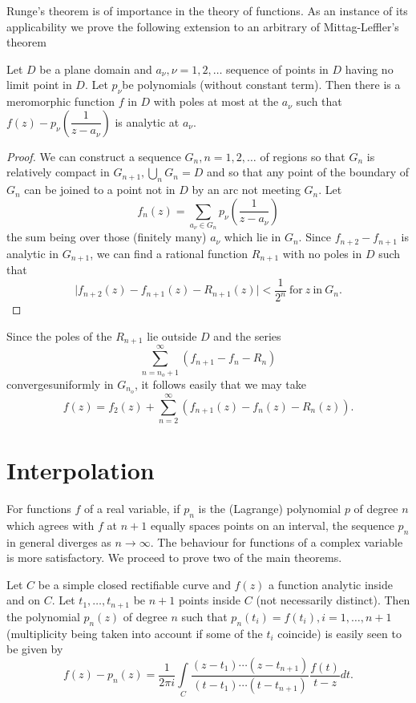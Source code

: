  Runge's theorem is of importance in the theory of functions.  As an
 instance of its applicability we prove the following extension to an
 arbitrary of Mittag-Leffler's theorem 

 \begin{Thm*}
   Let $D$ be a plane domain and $a_\nu ,  \nu = 1,2, \ldots$ sequence
   of points in $D$ having no limit point in $D$. Let $p_\nu$be
   polynomials (without constant term). Then there is a meromorphic
   function $f$ in $D$ with poles at most at the $a_\nu$ such that
   $f(z)-p_\nu \left(\dfrac{1}{z-a_\nu}\right)$ is analytic at $a_\nu$. 
 \end{Thm*} 

\begin{proof}
  We can construct a sequence $G_n, n=1,2, \ldots$ of regions so that
  $G_n$ is relatively compact in $G_{n+1}, \bigcup_n G_n =D$ and so
  that any point of the boundary of $G_n$ can be joined to a point not
  in $D$ by an arc not meeting $G_n$. Let  
  $$
  f_n (z) = \sum_{a_\nu  \in G_n} p_\nu \left(\frac{1}{z-a_\nu}\right)
  $$
  the sum  being over those (finitely many) $a_\nu$ which lie in
  $G_n$. Since  $f_{n+2}- f_{n+1}$ is analytic in $G_{n+1}$, we can
  find a rational function $R_{n+1}$ with no poles in $D$ such that  
  $$
  \bigg | f_{n+2} (z) - f_{n+1}(z) - R_{n+1}(z) \bigg | <
  \frac{1}{2^n}  ~\text{for}~ z ~\text{in}~ G_n. 
  $$
\end{proof} 

Since the poles of the $R_{n+1}$ lie outside $D$ and the series 
$$
\sum_{n=n_o +1}^\infty (f_{n+1} -f_n -R_n)
$$
converges\pageoriginale uniformly in $G_{n_o}$, it follows easily that
we may take  
$$
f(z)  = f_2(z) + \sum^{\infty}_{n=2} (f_{n+1}(z) - f_n(z) - R_n (z)).
$$

\section{Interpolation} %
 
 For functions $f$ of a real variable, if $p_n$ is the (Lagrange)
 polynomial $p$ of degree $n$ which agrees with $f$ at $n+1$ equally
 spaces points on an interval, the sequence $p_n$ in general diverges
 as $n \to \infty$. The behaviour for functions of a complex variable
 is more satisfactory. We proceed to prove two of the main theorems. 
 
 Let $C$ be a simple closed rectifiable curve and $f(z)$ a function
 analytic inside and on $C$. Let $t_1,  \ldots,  t_{n+1}$ be $n+1$
 points inside $C$ (not necessarily distinct). Then the polynomial
 $p_n(z)$ of degree $n$ such that $p_n (t_i) = f(t_i), i=1, \ldots, 
 n+1$ (multiplicity being taken into account if some of the $t_i$
 coincide) is easily seen to be given by  
 $$
 f(z) - p_n(z) = \frac{1}{2 \pi i} \int\limits_{C} \frac{(z-t_1)
 \cdots (z-t_{n+1})}{(t-t_1)\cdots (t-t_{n+1})} \frac{f(t)}{t-z} dt. 
 $$
 
